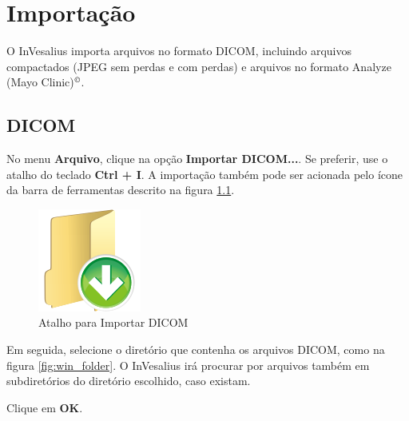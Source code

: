\chapter{Importação}

O InVesalius importa arquivos no formato DICOM, incluindo arquivos compactados (JPEG sem perdas e
com perdas) e arquivos no formato Analyze (Mayo Clinic)$^\copyright$.

\section{DICOM}

No menu \textbf{Arquivo}, clique na opção \textbf{Importar DICOM...}. Se preferir, use o atalho
do teclado \textbf{Ctrl + I}. A importação também pode ser acionada pelo ícone da barra de ferramentas
descrito na figura \ref{fig:import}.

\begin{figure}[!htb]
\centering
\includegraphics[scale=0.2]{../user_guide_figures/icons/file_import_original.png}
\caption{Atalho para Importar DICOM}
\label{fig:import}
\end{figure}

\hspace{.2cm}

Em seguida, selecione o diretório que contenha os arquivos DICOM, como na figura \ref{fig:win_folder}.
O InVesalius irá procurar por arquivos também em subdiretórios do diretório escolhido, caso existam.

\newpage

Clique em \textbf{OK}.

